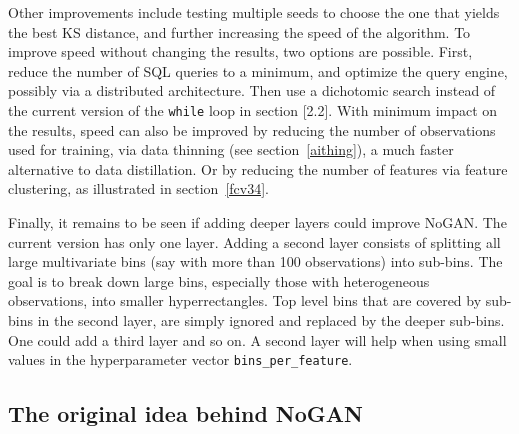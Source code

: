 \documentclass[oneside,10pt]{book}
\begin{document}
 Other improvements include testing multiple seeds to choose the one that yields the best KS distance, and further increasing the speed of the algorithm.
 To improve speed without changing the results, two options are possible. First, reduce the number of SQL queries to a minimum, and optimize the query engine, possibly via a
 distributed architecture. Then use a dichotomic search instead of the current version of the \texttt{while} loop in section [2.2].
With minimum impact on the results, speed can also be improved by reducing the number of observations used for training, via data thinning
 (see section~\ref{aithing}), a
 much faster alternative to \textcolor{index}{data distillation}. Or by reducing the number of features via
 \textcolor{index}{feature clustering}, as illustrated in section~\ref{fcv34}.

Finally, it remains to be seen if adding deeper layers could improve NoGAN. The current version has only one layer. Adding a second layer consists
 of splitting all large multivariate bins (say with more than 100 observations) into sub-bins. The goal is to break down large bins, especially those
 with heterogeneous observations, into smaller hyperrectangles. Top level bins that are covered by sub-bins in the second layer, are simply ignored and replaced by the deeper
 sub-bins. One could add a third layer and so on. A second layer will help when using small values in
 the hyperparameter vector \texttt{bins\_per\_feature}.

\subsection{The original idea behind NoGAN}
\end{document}
